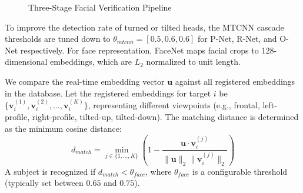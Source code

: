\documentclass[12pt,a4paper]{article}
\begin{document}
\begin{figure}[h]
    \centering
    \caption{Three-Stage Facial Verification Pipeline}
    \label{fig:face_pipeline}
\end{figure}

To improve the detection rate of turned or tilted heads, the MTCNN cascade thresholds are tuned down to $\theta_{mtcnn} = [0.5, 0.6, 0.6]$ for P-Net, R-Net, and O-Net respectively. For face representation, FaceNet maps facial crops to 128-dimensional embeddings, which are $L_2$ normalized to unit length. 

We compare the real-time embedding vector $\mathbf{u}$ against all registered embeddings in the database. Let the registered embeddings for target $i$ be $\{\mathbf{v}_i^{(1)}, \mathbf{v}_i^{(2)}, \dots, \mathbf{v}_i^{(K)}\}$, representing different viewpoints (e.g., frontal, left-profile, right-profile, tilted-up, tilted-down). The matching distance is determined as the minimum cosine distance:
\begin{equation}
    d_{match} = \min_{j \in \{1,\dots,K\}} \left( 1 - \frac{\mathbf{u} \cdot \mathbf{v}_i^{(j)}}{\|\mathbf{u}\|_2 \|\mathbf{v}_i^{(j)}\|_2} \right)
\end{equation}
A subject is recognized if $d_{match} < \theta_{face}$, where $\theta_{face}$ is a configurable threshold (typically set between $0.65$ and $0.75$).
\end{document}
